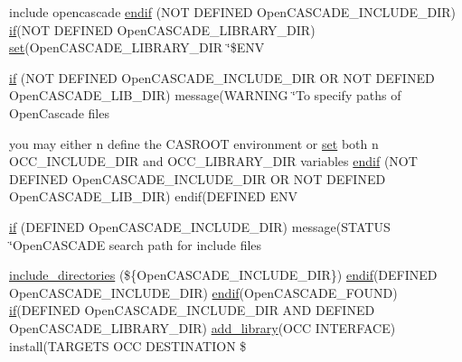 \begin{DoxyCompactItemize}
\item 
include opencascade \hyperlink{3rd__party_2OCC__dependency_2CMakeLists_8txt_a031f3c1a16f737d2532cb0cf3f76aaab}{endif} (N\+OT D\+E\+F\+I\+N\+ED Open\+C\+A\+S\+C\+A\+D\+E\+\_\+\+I\+N\+C\+L\+U\+D\+E\+\_\+\+D\+IR) \hyperlink{3rd__party_2OCC__dependency_2CMakeLists_8txt_a64a7251a2d6c5f84ee98be006734e24f}{if}(N\+OT D\+E\+F\+I\+N\+ED Open\+C\+A\+S\+C\+A\+D\+E\+\_\+\+L\+I\+B\+R\+A\+R\+Y\+\_\+\+D\+IR) \hyperlink{3rd__party_2OCC__dependency_2CMakeLists_8txt_a074553c33956a239810d7affac62c071}{set}(Open\+C\+A\+S\+C\+A\+D\+E\+\_\+\+L\+I\+B\+R\+A\+R\+Y\+\_\+\+D\+IR \char`\"{}\$E\+NV
\item 
\hyperlink{3rd__party_2OCC__dependency_2CMakeLists_8txt_a7ef2e59c36750ac4b0223f2c744697e0}{if} (N\+OT D\+E\+F\+I\+N\+ED Open\+C\+A\+S\+C\+A\+D\+E\+\_\+\+I\+N\+C\+L\+U\+D\+E\+\_\+\+D\+IR OR N\+OT D\+E\+F\+I\+N\+ED Open\+C\+A\+S\+C\+A\+D\+E\+\_\+\+L\+I\+B\+\_\+\+D\+IR) message(W\+A\+R\+N\+I\+NG \char`\"{}To specify paths of Open\+Cascade files
\item 
you may either n define the C\+A\+S\+R\+O\+OT environment or \hyperlink{3rd__party_2OCC__dependency_2CMakeLists_8txt_a074553c33956a239810d7affac62c071}{set} both n O\+C\+C\+\_\+\+I\+N\+C\+L\+U\+D\+E\+\_\+\+D\+IR and O\+C\+C\+\_\+\+L\+I\+B\+R\+A\+R\+Y\+\_\+\+D\+IR variables \hyperlink{3rd__party_2OCC__dependency_2CMakeLists_8txt_a3ffaea3e0c800aef2ee51b0e82b6ff89}{endif} (N\+OT D\+E\+F\+I\+N\+ED Open\+C\+A\+S\+C\+A\+D\+E\+\_\+\+I\+N\+C\+L\+U\+D\+E\+\_\+\+D\+IR OR N\+OT D\+E\+F\+I\+N\+ED Open\+C\+A\+S\+C\+A\+D\+E\+\_\+\+L\+I\+B\+\_\+\+D\+IR) endif(D\+E\+F\+I\+N\+ED E\+NV
\item 
\hyperlink{3rd__party_2OCC__dependency_2CMakeLists_8txt_a64a7251a2d6c5f84ee98be006734e24f}{if} (D\+E\+F\+I\+N\+ED Open\+C\+A\+S\+C\+A\+D\+E\+\_\+\+I\+N\+C\+L\+U\+D\+E\+\_\+\+D\+IR) message(S\+T\+A\+T\+US \char`\"{}Open\+C\+A\+S\+C\+A\+DE search path for include files
\item 
\hyperlink{3rd__party_2OCC__dependency_2CMakeLists_8txt_ad273c0e3a1a432b8404adfda2c24a19e}{include\+\_\+directories} (\$\{Open\+C\+A\+S\+C\+A\+D\+E\+\_\+\+I\+N\+C\+L\+U\+D\+E\+\_\+\+D\+IR\}) \hyperlink{3rd__party_2OCC__dependency_2CMakeLists_8txt_a49a9a7795e9d8c87a1813988236bb08b}{endif}(D\+E\+F\+I\+N\+ED Open\+C\+A\+S\+C\+A\+D\+E\+\_\+\+I\+N\+C\+L\+U\+D\+E\+\_\+\+D\+IR) \hyperlink{3rd__party_2OCC__dependency_2CMakeLists_8txt_a49a9a7795e9d8c87a1813988236bb08b}{endif}(Open\+C\+A\+S\+C\+A\+D\+E\+\_\+\+F\+O\+U\+ND) \hyperlink{3rd__party_2OCC__dependency_2CMakeLists_8txt_a64a7251a2d6c5f84ee98be006734e24f}{if}(D\+E\+F\+I\+N\+ED Open\+C\+A\+S\+C\+A\+D\+E\+\_\+\+I\+N\+C\+L\+U\+D\+E\+\_\+\+D\+IR A\+ND D\+E\+F\+I\+N\+ED Open\+C\+A\+S\+C\+A\+D\+E\+\_\+\+L\+I\+B\+R\+A\+R\+Y\+\_\+\+D\+IR) \hyperlink{Interface_2tools_2CMakeLists_8txt_a0ce3217fef9c2b9a0d23a3b8db43f787}{add\+\_\+library}(O\+CC I\+N\+T\+E\+R\+F\+A\+CE) install(T\+A\+R\+G\+E\+TS O\+CC D\+E\+S\+T\+I\+N\+A\+T\+I\+ON \$

\end{DoxyCompactItemize}
